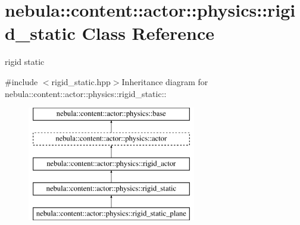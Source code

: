 \hypertarget{classnebula_1_1content_1_1actor_1_1physics_1_1rigid__static}{
\section{nebula::content::actor::physics::rigid\_\-static Class Reference}
\label{classnebula_1_1content_1_1actor_1_1physics_1_1rigid__static}
}


rigid static  


{\ttfamily \#include $<$rigid\_\-static.hpp$>$}Inheritance diagram for nebula::content::actor::physics::rigid\_\-static::\begin{figure}[H]
\begin{center}
\leavevmode
\includegraphics[height=5cm]{classnebula_1_1content_1_1actor_1_1physics_1_1rigid__static}
\end{center}
\end{figure}
